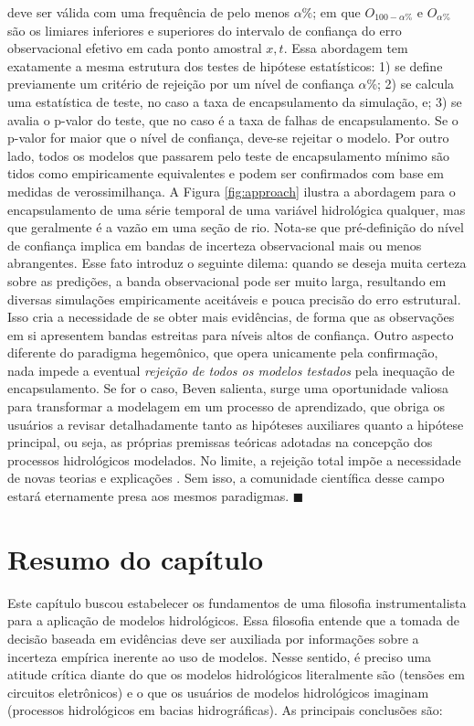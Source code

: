 \documentclass[./main.tex]{subfiles}
\begin{document}
deve ser válida com uma frequência de pelo menos $\alpha\%$; em que $O_{100-\alpha\%}$ e  $O_{\alpha\%}$ são os limiares inferiores e superiores do intervalo de confiança do erro observacional efetivo em cada ponto amostral $x, t$. Essa abordagem tem exatamente a mesma estrutura dos testes de hipótese estatísticos: 1) se define previamente um critério de rejeição por um nível de confiança $\alpha$\%; 2) se calcula uma estatística de teste, no caso a taxa de encapsulamento da simulação, e; 3) se avalia o p-valor do teste, que no caso é a taxa de falhas de encapsulamento. Se o p-valor for maior que o nível de confiança, deve-se rejeitar o modelo. Por outro lado, todos os modelos que passarem pelo teste de encapsulamento mínimo são tidos como empiricamente equivalentes e podem ser confirmados com base em medidas de verossimilhança. A Figura \ref{fig:approach} ilustra a abordagem para o encapsulamento de uma série temporal de uma variável hidrológica qualquer, mas que geralmente é a vazão em uma seção de rio. Nota-se que pré-definição do nível de confiança implica em bandas de incerteza observacional mais ou menos abrangentes. Esse fato introduz o seguinte dilema: quando se deseja muita certeza sobre as predições, a banda observacional pode ser muito larga, resultando em diversas simulações empiricamente aceitáveis e pouca precisão do erro estrutural. Isso cria a necessidade de se obter mais evidências, de forma que as observações em si apresentem bandas estreitas para níveis altos de confiança. Outro aspecto diferente do \gls{paradigma} hegemônico, que opera unicamente pela confirmação, nada impede a eventual \textit{rejeição de todos os modelos testados} pela inequação de encapsulamento. Se for o caso, Beven salienta, surge uma oportunidade valiosa para transformar a modelagem em um processo de aprendizado, que obriga os usuários a revisar detalhadamente tanto as hipóteses auxiliares quanto a hipótese principal, ou seja, as próprias premissas teóricas adotadas na concepção dos processos hidrológicos modelados. No limite, a rejeição total impõe a necessidade de novas teorias e explicações \cite{Beven2018}. Sem isso, a comunidade científica desse campo estará eternamente presa aos mesmos paradigmas. $\blacksquare$

\clearpage

\section{Resumo do capítulo} \label{sec:epis:summary}

\par Este capítulo buscou estabelecer os fundamentos de uma filosofia instrumentalista para a aplicação de modelos hidrológicos. Essa filosofia entende que a tomada de decisão baseada em evidências deve ser auxiliada por informações sobre a incerteza empírica inerente ao uso de modelos. Nesse sentido, é preciso uma atitude crítica diante do que os modelos hidrológicos literalmente são (tensões em circuitos eletrônicos) e o que os usuários de modelos hidrológicos imaginam (processos hidrológicos em bacias hidrográficas). As principais conclusões são:
\end{document}
